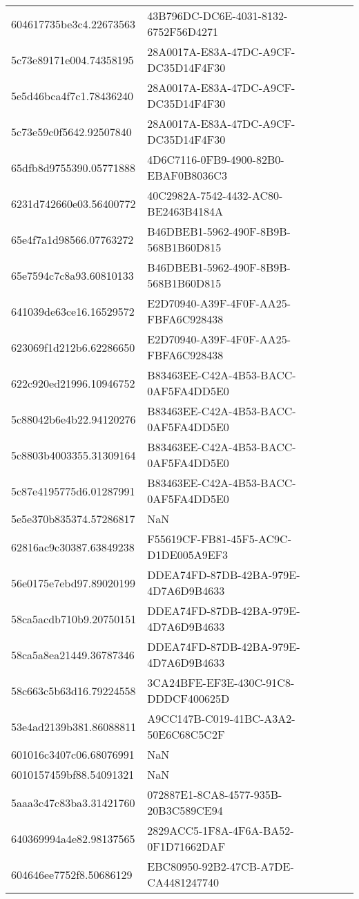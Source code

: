 \begin{tabular}{ll}
604617735be3c4.22673563 & 43B796DC-DC6E-4031-8132-6752F56D4271 \\
5c73e89171e004.74358195 & 28A0017A-E83A-47DC-A9CF-DC35D14F4F30 \\
5e5d46bca4f7c1.78436240 & 28A0017A-E83A-47DC-A9CF-DC35D14F4F30 \\
5c73e59c0f5642.92507840 & 28A0017A-E83A-47DC-A9CF-DC35D14F4F30 \\
65dfb8d9755390.05771888 & 4D6C7116-0FB9-4900-82B0-EBAF0B8036C3 \\
6231d742660e03.56400772 & 40C2982A-7542-4432-AC80-BE2463B4184A \\
65e4f7a1d98566.07763272 & B46DBEB1-5962-490F-8B9B-568B1B60D815 \\
65e7594c7c8a93.60810133 & B46DBEB1-5962-490F-8B9B-568B1B60D815 \\
641039de63ce16.16529572 & E2D70940-A39F-4F0F-AA25-FBFA6C928438 \\
623069f1d212b6.62286650 & E2D70940-A39F-4F0F-AA25-FBFA6C928438 \\
622c920ed21996.10946752 & B83463EE-C42A-4B53-BACC-0AF5FA4DD5E0 \\
5c88042b6e4b22.94120276 & B83463EE-C42A-4B53-BACC-0AF5FA4DD5E0 \\
5c8803b4003355.31309164 & B83463EE-C42A-4B53-BACC-0AF5FA4DD5E0 \\
5c87e4195775d6.01287991 & B83463EE-C42A-4B53-BACC-0AF5FA4DD5E0 \\
5e5e370b835374.57286817 & NaN \\
62816ac9c30387.63849238 & F55619CF-FB81-45F5-AC9C-D1DE005A9EF3 \\
56e0175e7ebd97.89020199 & DDEA74FD-87DB-42BA-979E-4D7A6D9B4633 \\
58ca5acdb710b9.20750151 & DDEA74FD-87DB-42BA-979E-4D7A6D9B4633 \\
58ca5a8ea21449.36787346 & DDEA74FD-87DB-42BA-979E-4D7A6D9B4633 \\
58c663c5b63d16.79224558 & 3CA24BFE-EF3E-430C-91C8-DDDCF400625D \\
53e4ad2139b381.86088811 & A9CC147B-C019-41BC-A3A2-50E6C68C5C2F \\
601016c3407c06.68076991 & NaN \\
6010157459bf88.54091321 & NaN \\
5aaa3c47c83ba3.31421760 & 072887E1-8CA8-4577-935B-20B3C589CE94 \\
640369994a4e82.98137565 & 2829ACC5-1F8A-4F6A-BA52-0F1D71662DAF \\
604646ee7752f8.50686129 & EBC80950-92B2-47CB-A7DE-CA4481247740 \\

\end{tabular}
